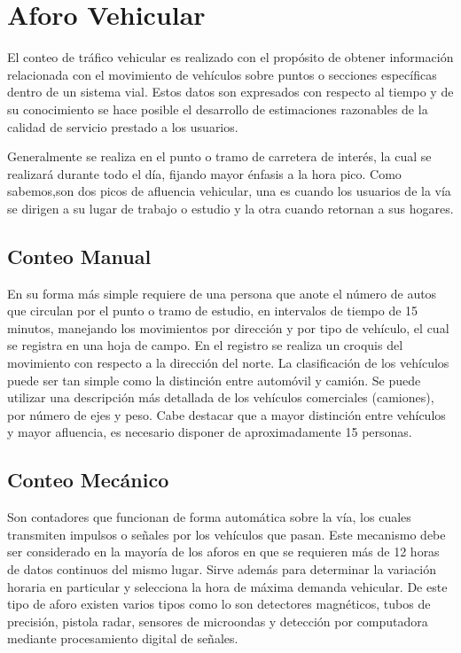 \section{Aforo Vehicular}
El conteo de tráfico vehicular es realizado con el propósito de obtener información relacionada con el movimiento de vehículos sobre puntos o secciones específicas dentro de un sistema vial. Estos datos son expresados con respecto al tiempo y de su conocimiento se hace posible el desarrollo de estimaciones razonables de la calidad de servicio prestado a los usuarios.

Generalmente se realiza en el punto o tramo de carretera de interés, la cual se realizará durante todo el día, fijando mayor énfasis a la hora pico. Como sabemos,son dos picos de afluencia vehicular, una es cuando los usuarios de la vía se dirigen a su lugar de trabajo o estudio y la otra cuando retornan a sus hogares.

\subsection{Conteo Manual}
En su forma más simple requiere de una persona que anote el número de autos que circulan por el punto o tramo de estudio, en intervalos de tiempo de 15 minutos, manejando los movimientos por dirección y por tipo de vehículo, el cual se registra en una hoja de campo. En el registro se realiza un croquis del movimiento con respecto a la dirección del norte. La clasificación de los vehículos puede ser tan simple como la distinción entre automóvil y camión. Se puede utilizar una descripción más detallada de los vehículos comerciales (camiones), por número de ejes y peso. Cabe destacar que a mayor distinción entre vehículos y mayor afluencia, es necesario disponer de aproximadamente 15 personas.

\subsection{Conteo Mecánico}
Son contadores que funcionan de forma automática sobre la vía, los cuales transmiten impulsos o señales por los vehículos que pasan. Este mecanismo debe ser considerado en la mayoría de los aforos en que se requieren más de 12 horas de datos continuos del mismo lugar. Sirve además para determinar la variación horaria en particular y selecciona la hora de máxima demanda vehicular. De este tipo de aforo existen varios tipos como lo son detectores magnéticos, tubos de precisión, pistola radar, sensores de microondas y detección por computadora mediante procesamiento digital de señales.

